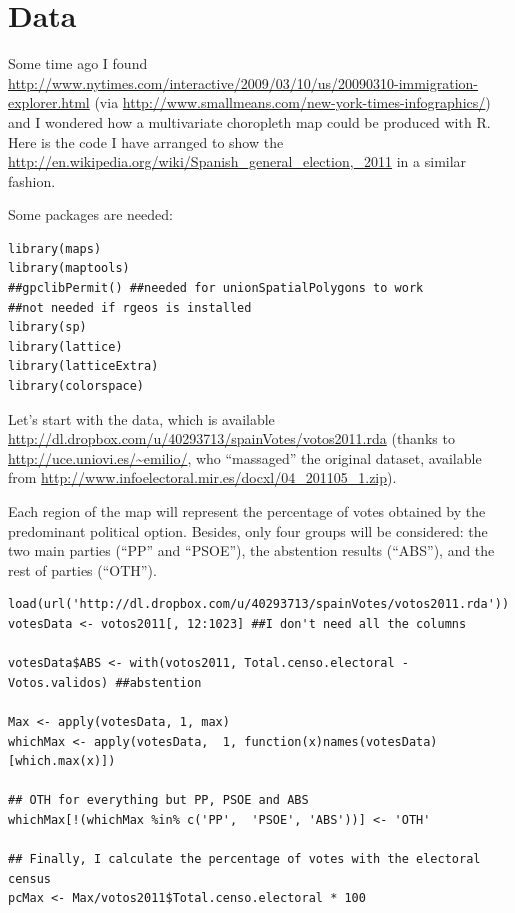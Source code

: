 


\section{Data}
\label{sec-1}



Some time ago I found \url{http://www.nytimes.com/interactive/2009/03/10/us/20090310-immigration-explorer.html} (via
\url{http://www.smallmeans.com/new-york-times-infographics/}) and I wondered how a multivariate choropleth map could be
produced with R. Here is the code I have arranged to show the \url{http://en.wikipedia.org/wiki/Spanish_general_election,_2011} in a similar fashion.

Some packages are needed:


\lstset{language=R}
\begin{lstlisting}
library(maps)
library(maptools)
##gpclibPermit() ##needed for unionSpatialPolygons to work
##not needed if rgeos is installed
library(sp)
library(lattice)
library(latticeExtra)
library(colorspace)
\end{lstlisting}

Let's start with the data, which is available \url{http://dl.dropbox.com/u/40293713/spainVotes/votos2011.rda} (thanks to \url{http://uce.uniovi.es/~emilio/}, who ``massaged'' the original dataset, available from \url{http://www.infoelectoral.mir.es/docxl/04_201105_1.zip}).

Each region of the map will represent the percentage of votes obtained
by the predominant political option.  Besides, only four groups will
be considered: the two main parties (``PP'' and ``PSOE''), the abstention
results (``ABS''), and the rest of parties (``OTH'').


\lstset{language=R}
\begin{lstlisting}
load(url('http://dl.dropbox.com/u/40293713/spainVotes/votos2011.rda'))
votesData <- votos2011[, 12:1023] ##I don't need all the columns

votesData$ABS <- with(votos2011, Total.censo.electoral - Votos.validos) ##abstention

Max <- apply(votesData, 1, max)
whichMax <- apply(votesData,  1, function(x)names(votesData)[which.max(x)])

## OTH for everything but PP, PSOE and ABS
whichMax[!(whichMax %in% c('PP',  'PSOE', 'ABS'))] <- 'OTH'

## Finally, I calculate the percentage of votes with the electoral census
pcMax <- Max/votos2011$Total.censo.electoral * 100
\end{lstlisting}
